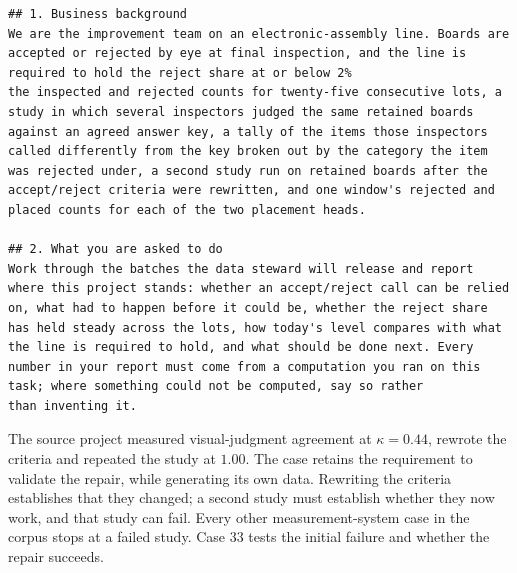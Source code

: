 \documentclass{article}
\begin{document}
\begin{lstlisting}[caption={Sections 1 and 2 of the instruction for case 33.},label={lst:c33}]
## 1. Business background
We are the improvement team on an electronic-assembly line. Boards are
accepted or rejected by eye at final inspection, and the line is
required to hold the reject share at or below 2%
the inspected and rejected counts for twenty-five consecutive lots, a
study in which several inspectors judged the same retained boards
against an agreed answer key, a tally of the items those inspectors
called differently from the key broken out by the category the item
was rejected under, a second study run on retained boards after the
accept/reject criteria were rewritten, and one window's rejected and
placed counts for each of the two placement heads.

## 2. What you are asked to do
Work through the batches the data steward will release and report
where this project stands: whether an accept/reject call can be relied
on, what had to happen before it could be, whether the reject share
has held steady across the lots, how today's level compares with what
the line is required to hold, and what should be done next. Every
number in your report must come from a computation you ran on this
task; where something could not be computed, say so rather
than inventing it.
\end{lstlisting}
\par\medskip

The source project measured visual-judgment agreement at $\kappa = 0.44$, rewrote the criteria and repeated the study at $1.00$. The case retains the requirement to validate the repair, while generating its own data. Rewriting the criteria establishes that they changed; a second study must establish whether they now work, and that study can fail. Every other measurement-system case in the corpus stops at a failed study. Case 33 tests the initial failure and whether the repair succeeds.
\end{document}
